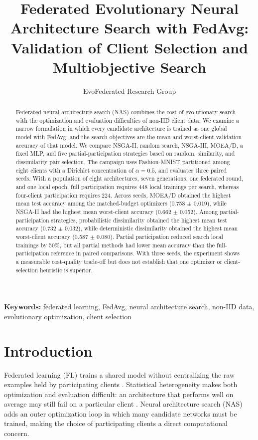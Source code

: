\documentclass[11pt]{article}
\title{Federated Evolutionary Neural Architecture Search with FedAvg:\\
Validation of Client Selection and Multiobjective Search}
\author{EvoFederated Research Group}
\date{}
\begin{document}
\maketitle

\begin{abstract}
Federated neural architecture search (NAS) combines the cost of evolutionary search with the optimization and evaluation difficulties of non-IID client data. We examine a narrow formulation in which every candidate architecture is trained as one global model with FedAvg, and the search objectives are the mean and worst-client validation accuracy of that model. We compare NSGA-II, random search, NSGA-III, MOEA/D, a fixed MLP, and five partial-participation strategies based on random, similarity, and dissimilarity pair selection. The campaign uses Fashion-MNIST partitioned among eight clients with a Dirichlet concentration of $\alpha=0.5$, and evaluates three paired seeds. With a population of eight architectures, seven generations, one federated round, and one local epoch, full participation requires 448 local trainings per search, whereas four-client participation requires 224. Across seeds, MOEA/D obtained the highest mean test accuracy among the matched-budget optimizers (0.758 $\pm$ 0.019), while NSGA-II had the highest mean worst-client accuracy (0.662 $\pm$ 0.052). Among partial-participation strategies, probabilistic dissimilarity obtained the highest mean test accuracy (0.732 $\pm$ 0.032), while deterministic dissimilarity obtained the highest mean worst-client accuracy (0.587 $\pm$ 0.080). Partial participation reduced search local trainings by 50\%, but all partial methods had lower mean accuracy than the full-participation reference in paired comparisons. With three seeds, the experiment shows a measurable cost-quality trade-off but does not establish that one optimizer or client-selection heuristic is superior.
\end{abstract}

\noindent\textbf{Keywords:} federated learning, FedAvg, neural architecture search, non-IID data, evolutionary optimization, client selection

\section{Introduction}

Federated learning (FL) trains a shared model without centralizing the raw examples held by participating clients \cite{mcmahan2017}. Statistical heterogeneity makes both optimization and evaluation difficult: an architecture that performs well on average may still fail on a particular client \cite{kairouz2021}. Neural architecture search (NAS) adds an outer optimization loop in which many candidate networks must be trained, making the choice of participating clients a direct computational concern.
\end{document}

